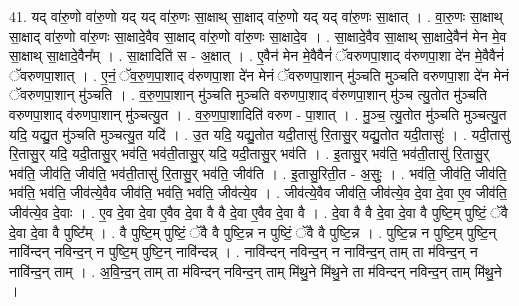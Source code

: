 \documentclass[17pt]{extarticle}
\begin{document}
41. यद् वा॑रु॒णो वा॑रु॒णो यद् यद् वा॑रु॒णः सा॒क्षाथ् सा॒क्षाद् वा॑रु॒णो यद् यद् वा॑रु॒णः सा॒क्षात् । . वा॒रु॒णः सा॒क्षाथ् सा॒क्षाद् वा॑रु॒णो वा॑रु॒णः सा॒क्षादे॒वैव सा॒क्षाद् वा॑रु॒णो वा॑रु॒णः सा॒क्षादे॒व । . सा॒क्षादे॒वैव सा॒क्षाथ् सा॒क्षादे॒वैन॑ मेन मे॒व सा॒क्षाथ् सा॒क्षादे॒वैन᳚म् । . सा॒क्षादिति॑ स - अ॒क्षात् । . ए॒वैन॑ मेन मे॒वैवैनं॑ ॅवरुणपा॒शाद् व॑रुणपा॒शा दे॑न मे॒वैवैनं॑ ॅवरुणपा॒शात् । . ए॒नं॒ ॅव॒रु॒ण॒पा॒शाद् व॑रुणपा॒शा दे॑न मेनं ॅवरुणपा॒शान् मु॑ञ्चति मुञ्चति वरुणपा॒शा दे॑न मेनं ॅवरुणपा॒शान् मु॑ञ्चति । . व॒रु॒ण॒पा॒शान् मु॑ञ्चति मुञ्चति वरुणपा॒शाद् व॑रुणपा॒शान् मु॑ञ्च त्यु॒तोत मु॑ञ्चति वरुणपा॒शाद् व॑रुणपा॒शान् मु॑ञ्चत्यु॒त । . व॒रु॒ण॒पा॒शादिति॑ वरुण - पा॒शात् । . मु॒ञ्च॒ त्यु॒तोत मु॑ञ्चति मुञ्चत्यु॒त यदि॒ यद्यु॒त मु॑ञ्चति मुञ्चत्यु॒त यदि॑ । . उ॒त यदि॒ यद्यु॒तोत यदी॒तासु॑ रि॒तासु॒र् यद्यु॒तोत यदी॒तासुः॑ । . यदी॒तासु॑ रि॒तासु॒र् यदि॒ यदी॒तासु॒र् भव॑ति॒ भव॑ती॒तासु॒र् यदि॒ यदी॒तासु॒र् भव॑ति । . इ॒तासु॒र् भव॑ति॒ भव॑ती॒तासु॑ रि॒तासु॒र् भव॑ति॒ जीव॑ति॒ जीव॑ति॒ भव॑ती॒तासु॑ रि॒तासु॒र् भव॑ति॒ जीव॑ति । . इ॒तासु॒रिती॒त - अ॒सुः॒ । . भव॑ति॒ जीव॑ति॒ जीव॑ति॒ भव॑ति॒ भव॑ति॒ जीव॑त्ये॒वैव जीव॑ति॒ भव॑ति॒ भव॑ति॒ जीव॑त्ये॒व । . जीव॑त्ये॒वैव जीव॑ति॒ जीव॑त्ये॒व दे॒वा दे॒वा ए॒व जीव॑ति॒ जीव॑त्ये॒व दे॒वाः । . ए॒व दे॒वा दे॒वा ए॒वैव दे॒वा वै वै दे॒वा ए॒वैव दे॒वा वै । . दे॒वा वै वै दे॒वा दे॒वा वै पुष्टि॒म् पुष्टिं॒ ॅवै दे॒वा दे॒वा वै पुष्टि᳚म् । . वै पुष्टि॒म् पुष्टिं॒ ॅवै वै पुष्टि॒न्न न पुष्टिं॒ ॅवै वै पुष्टि॒न्न । . पुष्टि॒न्न न पुष्टि॒म् पुष्टि॒न् नावि॑न्दन् नविन्द॒न् न पुष्टि॒म् पुष्टि॒न् नावि॑न्दन्न् । . नावि॑न्दन् नविन्द॒न् न नावि॑न्द॒न् ताम् ता म॑विन्द॒न् न नावि॑न्द॒न् ताम् । . अ॒वि॒न्द॒न् ताम् ता म॑विन्दन् नविन्द॒न् ताम् मि॑थु॒ने मि॑थु॒ने ता म॑विन्दन् नविन्द॒न् ताम् मि॑थु॒ने । \newline
\pagebreak
{}
\end{document}
